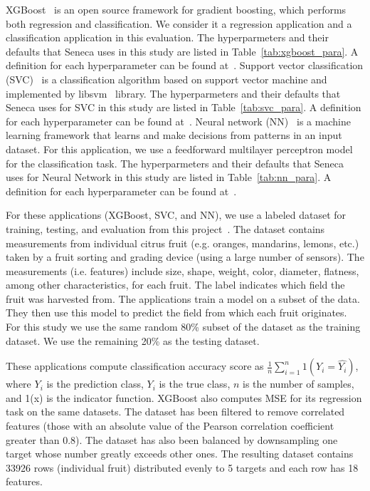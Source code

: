 XGBoost~\cite{ref:xgboost-web} is an open source framework for gradient boosting, which 
performs both regression and classification. We consider it a regression application and
a classification application in this evaluation.  
The hyperparmeters and their defaults that Seneca uses in this study are listed in Table~\ref{tab:xgboost_para}. A definition for each hyperparameter can be found at~\cite{ref:xgboostparams}.
Support vector classification (SVC)~\cite{ref:svc} is a classification algorithm 
based on support vector machine and implemented by libsvm~\cite{ref:libsvm} library.
The hyperparmeters and their defaults that Seneca uses for SVC in this study are listed in Table~\ref{tab:svc_para}. A definition for each hyperparameter can be found at~\cite{ref:svcparams}.
Neural network (NN)~\cite{ref:neural_network} is a machine learning framework that learns 
and make decisions from patterns in an input dataset. For this application, 
we use a feedforward multilayer perceptron model~\cite{ref:feedforward_nn} 
for the classification task.
The hyperparmeters and their defaults that Seneca uses for Neural Network in this study are listed in Table~\ref{tab:nn_para}. A definition for each hyperparameter can be found at~\cite{ref:nnparams}.

For these applications (XGBoost, SVC, and NN), we use a labeled
dataset for training, testing, and evaluation from this
project~\cite{iot-cpu}. The dataset contains measurements from individual
citrus fruit (e.g. oranges, mandarins, lemons, etc.) taken by a fruit sorting
and grading device (using a large number of sensors).  The measurements (i.e.
features) include size, shape, weight, color, diameter, flatness, among other
characteristics, for each fruit.  The label indicates which field the fruit
was harvested from.  The applications train a model on a subset of the
data.  They then use this model to predict the field
from which each fruit originates. For this study we use the same random 80\%
subset of the dataset as the training dataset.  We use the remaining 20\% as the
testing dataset.

These applications compute classification accuracy score
as $\frac{1}{n}\sum_{i=1}^{n}1(Y_i = \hat{Y_i})$, where $Y_i$ is the
prediction class, $Y_i$ is the true class, $n$ is the number of samples, and 1(x)
is the indicator function. XGBoost also computes MSE for its regression task
on the same datasets. The dataset has been filtered to remove correlated
features (those with an absolute value of the Pearson correlation coefficient
greater than 0.8). The dataset has also been balanced by downsampling one
target whose number greatly exceeds other ones. The resulting dataset contains
33926 rows (individual fruit) distributed evenly to 5 targets and each row has
18 features.


